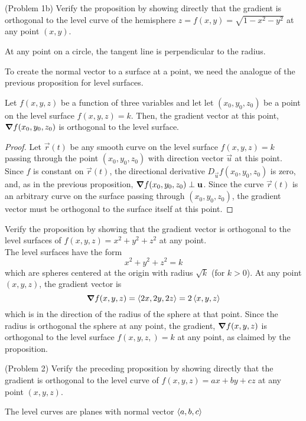 \documentclass[handout]{ximera}
\begin{document}
\begin{problem}(Problem 1b)
Verify the proposition by showing directly that the gradient is orthogonal to the level curve  of the hemisphere $z = f(x,y) = \sqrt{1 - x^2 - y^2}$ at any point $(x,y)$.
\begin{hint}
At any point on a circle, the tangent line is perpendicular to the radius.
\end{hint}
\end{problem}

To create the normal vector to a surface at a point, we need the analogue of the previous proposition for level surfaces.

\begin{proposition}
Let $f(x,y,z)$ be a function of three variables and let let $(x_0, y_0, z_0)$ be a point on the level surface $f(x,y, z) = k$.
Then, the gradient vector at this point, $\boldsymbol\nabla f(x_0, y_0, z_0)$ is orthogonal to the level surface.
\end{proposition}
\begin{proof}
Let $\vec r(t)$ be any smooth curve on the level surface $f(x,y, z) = k$ passing through the point $(x_0, y_0, z_0)$ with direction vector $\vec u$ at this point.
Since $f$ is constant on $\vec r(t)$, the directional derivative $D_{\vec u} f(x_0, y_0, z_0)$ is zero, and, as in the previous proposition, 
$\boldsymbol\nabla f(x_0, y_0, z_0) \perp \mathbf u$.  
Since the curve $\vec r(t)$ is an arbitrary curve on the surface passing through $(x_0, y_0, z_0)$, the gradient vector must be 
orthogonal to the surface itself at this point.
\end{proof}

\begin{example}[Example 2]
Verify the proposition by showing that the gradient vector is orthogonal to the level surfaces of $f(x, y, z) = x^2 + y^2 + z^2$ at any point.\\
The level surfaces have the form
\[
x^2 + y^2 + z^2 = k
\]
which are spheres centered at the origin with radius $\sqrt k$ (for $k>0$).
At any point $(x, y, z)$, the gradient vector is
\[
\boldsymbol\nabla f(x, y, z) = \left\langle 2x, 2y, 2z\right\rangle = 2\left\langle x, y, z\right\rangle
\]
which is in the direction of the radius of the sphere at that point. Since the radius is orthogonal the sphere at any point,
the gradient, $\boldsymbol\nabla f(x,y,z)$ is orthogonal to the level surface $f(x, y, z,) = k$ at any point, as claimed by the proposition.
\end{example}

\begin{problem}(Problem 2)
Verify the preceding proposition by showing directly that the gradient is orthogonal to the level curve  of $f(x,y, z) = ax + by + cz$ at any point $(x,y, z)$.
\begin{hint}
The level curves are planes with normal vector $\left\langle a, b, c\right\rangle$
\end{hint}
\end{problem}
\end{document}
